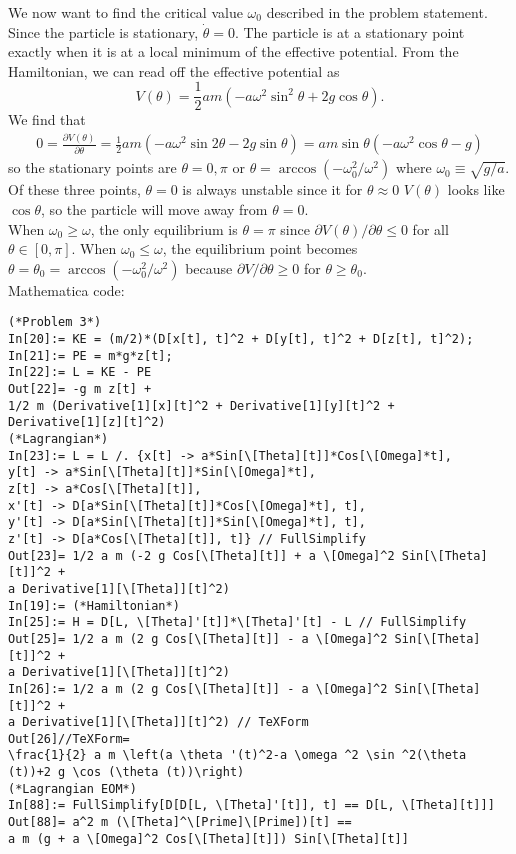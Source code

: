 \documentclass{article}
\theoremstyle{definition}
\newcommand{\p}{\partial}
\newcommand{\f}[2]{\frac{#1}{#2}}
\newcommand{\lp}{\left(}
\newcommand{\rp}{\right)}
\begin{document}
We now want to find the critical value $\omega_0$ described in the problem statement. Since the particle is stationary, $\dot{\theta} = 0$. The particle is at a stationary point exactly when it is at a local minimum of the effective potential. From the Hamiltonian, we can read off the effective potential as 
\begin{equation*}
V(\theta) = \f{1}{2}am\lp -a\omega^2\sin^2\theta + 2g\cos\theta \rp.
\end{equation*}
We find that 
\begin{align*}
0 = \f{\p V(\theta)}{\p \theta} = \f{1}{2}am\lp -a\omega^2\sin 2\theta -2g\sin\theta \rp = am\sin\theta \lp -a\omega^2\cos\theta - g  \rp 
\end{align*}
so the stationary points are $\theta = 0, \pi$ or $\theta = \arccos(-\omega_0^2/\omega^2)$ where $\boxed{\omega_0 \equiv \sqrt{g/a}}$. Of these three points, $\theta=0$ is always unstable since it for $\theta\approx 0$ $V(\theta)$ looks like $\cos\theta$, so the particle will move away from $\theta=0$. \\

When $\omega_0 \geq  \omega$, the only equilibrium is $\theta=\pi$ since $\p V(\theta)/\p \theta \leq 0$ for all $\theta \in[0,\pi]$. When $\omega_0 \leq \omega$, the equilibrium point becomes $\theta = \theta_0 = \arccos(-\omega_0^2/\omega^2)$ because $\p V/\p \theta \geq 0$ for $\theta \geq \theta_0$.\\


Mathematica code:
\begin{lstlisting}
(*Problem 3*)
In[20]:= KE = (m/2)*(D[x[t], t]^2 + D[y[t], t]^2 + D[z[t], t]^2);
In[21]:= PE = m*g*z[t];
In[22]:= L = KE - PE
Out[22]= -g m z[t] + 
1/2 m (Derivative[1][x][t]^2 + Derivative[1][y][t]^2 + 
Derivative[1][z][t]^2)
(*Lagrangian*)
In[23]:= L = L /. {x[t] -> a*Sin[\[Theta][t]]*Cos[\[Omega]*t], 
y[t] -> a*Sin[\[Theta][t]]*Sin[\[Omega]*t], 
z[t] -> a*Cos[\[Theta][t]],
x'[t] -> D[a*Sin[\[Theta][t]]*Cos[\[Omega]*t], t], 
y'[t] -> D[a*Sin[\[Theta][t]]*Sin[\[Omega]*t], t], 
z'[t] -> D[a*Cos[\[Theta][t]], t]} // FullSimplify
Out[23]= 1/2 a m (-2 g Cos[\[Theta][t]] + a \[Omega]^2 Sin[\[Theta][t]]^2 + 
a Derivative[1][\[Theta]][t]^2)
In[19]:= (*Hamiltonian*)
In[25]:= H = D[L, \[Theta]'[t]]*\[Theta]'[t] - L // FullSimplify
Out[25]= 1/2 a m (2 g Cos[\[Theta][t]] - a \[Omega]^2 Sin[\[Theta][t]]^2 + 
a Derivative[1][\[Theta]][t]^2)
In[26]:= 1/2 a m (2 g Cos[\[Theta][t]] - a \[Omega]^2 Sin[\[Theta][t]]^2 + 
a Derivative[1][\[Theta]][t]^2) // TeXForm
Out[26]//TeXForm=
\frac{1}{2} a m \left(a \theta '(t)^2-a \omega ^2 \sin ^2(\theta
(t))+2 g \cos (\theta (t))\right)
(*Lagrangian EOM*)
In[88]:= FullSimplify[D[D[L, \[Theta]'[t]], t] == D[L, \[Theta][t]]]
Out[88]= a^2 m (\[Theta]^\[Prime]\[Prime])[t] == 
a m (g + a \[Omega]^2 Cos[\[Theta][t]]) Sin[\[Theta][t]]
\end{lstlisting}
\end{document}
